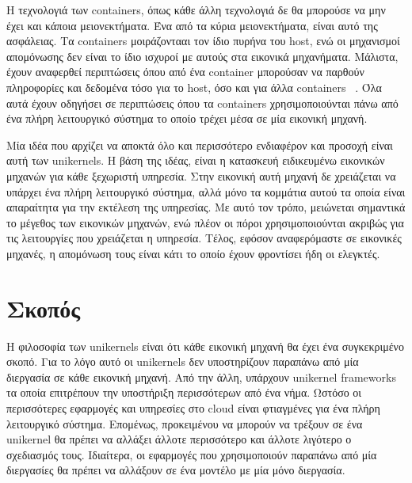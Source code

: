 Η τεχνολογιά των containers, όπως κάθε άλλη τεχνολογιά δε θα μπορούσε να μην
έχει και κάποια μειονεκτήματα. Ένα από τα κύρια μειονεκτήματα, είναι αυτό της
ασφάλειας. Τα containers μοιράζοντααι τον ίδιο πυρήνα του host, ενώ οι
μηχανισμοί απομόνωσης δεν είναι το ίδιο ισχυροί με αυτούς στα εικονικά
μηχανήματα. Μάλιστα, έχουν αναφερθεί περιπτώσεις όπου από ένα container
μπορούσαν να παρθούν πληροφορίες και δεδομένα τόσο για το host, όσο και για άλλα
containers ~\cite{gao2017containerleaks}. Όλα αυτά έχουν οδηγήσει σε περιπτώσεις
όπου τα containers χρησιμοποιούνται πάνω από ένα πλήρη λειτουργικό σύστημα το
οποίο τρέχει μέσα σε μία εικονική μηχανή.

Μία ιδέα που αρχίζει να αποκτά όλο και περισσότερο ενδιαφέρον και προσοχή 
είναι αυτή των unikernels. Η βάση της ιδέας, είναι  η
κατασκευή ειδικευμένω εικονικών μηχανών για κάθε ξεχωριστή υπηρεσία. Στην
εικονική αυτή μηχανή δε χρειάζεται να υπάρχει ένα πλήρη λειτουργικό σύστημα,
αλλά μόνο τα κομμάτια αυτού τα οποία είναι απαραίτητα για την εκτέλεση της
υπηρεσίας. Με αυτό τον τρόπο, μειώνεται σημαντικά το μέγεθος των εικονικών
μηχανών, ενώ πλέον οι πόροι χρησιμοποιούνται ακριβώς για τις λειτουργίες που
χρειάζεται η υπηρεσία. Τέλος, εφόσον αναφερόμαστε σε εικονικές μηχανές, η
απομόνωση τους είναι κάτι το οποίο έχουν φροντίσει ήδη οι ελεγκτές. 

\section{Σκοπός}

Η φιλοσοφία των unikernels είναι ότι κάθε εικονική μηχανή θα έχει ένα
συγκεκριμένο σκοπό. Για το λόγο αυτό οι unikernels δεν υποστηρίζουν παραπάνω
από μία διεργασία σε κάθε εικονική μηχανή. Από την άλλη, υπάρχουν unikernel
frameworks τα οποία επιτρέπουν την υποστήριξη περισσότερων από ένα νήμα. Ωστόσο
οι περισσότερες εφαρμογές και υπηρεσίες στο cloud είναι φτιαγμένες για ένα πλήρη
λειτουργικό σύστημα. Επομένως, προκειμένου να μπορούν να τρέξουν σε ένα
unikernel θα πρέπει να αλλάξει άλλοτε περισσότερο και άλλοτε λιγότερο ο
σχεδιασμός τους. Ιδιαίτερα, οι εφαρμογές που χρησιμοποιούν παραπάνω από μία
διεργασίες θα πρέπει να αλλάξουν σε ένα μοντέλο με μία μόνο διεργασία. 


